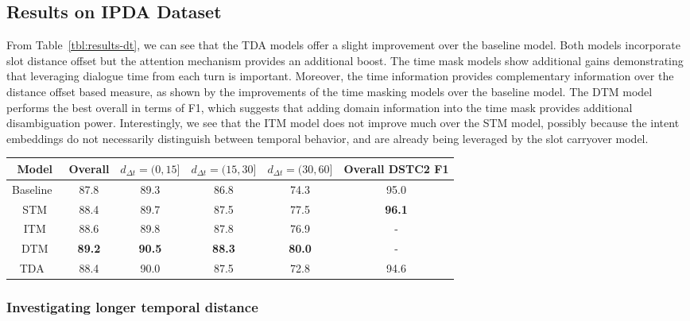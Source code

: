 \documentclass[11pt,a4paper]{article}
\begin{document}
\subsection{Results on IPDA Dataset}
\label{ssec:results}
From Table~\ref{tbl:results-dt}, we can see that the TDA models offer a slight improvement over the baseline model.
Both models incorporate slot distance offset but the attention mechanism provides an additional boost.
The time mask models show additional gains demonstrating that leveraging dialogue time from each turn is important.
Moreover, the time information provides complementary information over the distance offset based measure, as shown by the improvements of the time masking models over the baseline model.
The DTM model performs the best overall in terms of F1, which suggests that adding domain information into the time mask provides additional disambiguation power.
Interestingly, we see that the ITM model does not improve much over the STM model, possibly because the intent embeddings do not necessarily distinguish between temporal behavior, and are already being leveraged by the slot carryover model. 

\begin{table*}[ht]
\small
\begin{center}
\begin{tabular}{|c||c|c|c|c||c|} \hline
Model & Overall & $d_{\Delta t}=(0, 15]$ & $d_{\Delta t}=(15, 30]$ & $d_{\Delta t}=(30, 60]$ & Overall DSTC2 F1 \\\hline
Baseline~\citep{cc-inter} & 87.8 & 89.3 & 86.8 & 74.3 & 95.0\\
STM & 88.4 & 89.7 & 87.5 & 77.5 & \textbf{96.1} \\
ITM & 88.6 & 89.8 & 87.8 & 76.9 & - \\
DTM & \textbf{89.2} & \textbf{90.5} & \textbf{88.3} & \textbf{80.0} & - \\\hline
TDA~\cite{su2018time}   & 88.4 & 90.0 & 87.5 & 72.8 & 94.6 \\\hline
\end{tabular}
\end{center}
\caption{
Overall F1 scores on the IPDA and DSTC2 dataset as well as F1 scores binned by $d_{\Delta t}$ for the IPDA dataset, which is measured in seconds. Note: the DSTC2 dataset only contains a single domain 
}
\label{tbl:results-dt}
\end{table*}

\subsubsection{Investigating longer temporal distance}
\label{sssec:large-t}
\end{document}
